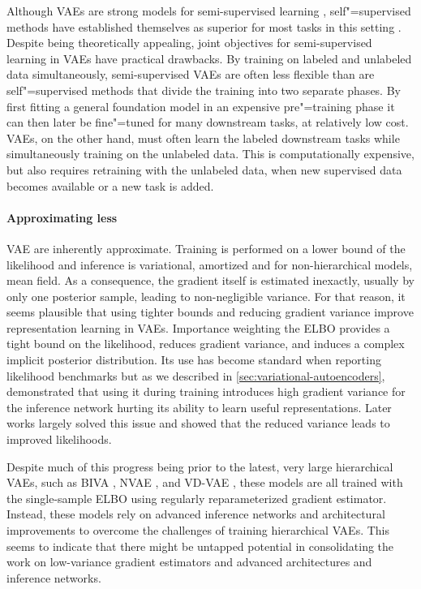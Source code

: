 Although VAEs are strong models for semi-supervised learning \parencite{kingma_semi-supervised_2014,kingma_improved_2016,maaloe_biva_2019}, self"=supervised methods have established themselves as superior for most tasks in this setting \cite{baevski_wav2vec_2020,jiang_speech_2021, liu_learning_2023}. 
Despite being theoretically appealing, joint objectives for semi-supervised learning in VAEs have practical drawbacks. By training on labeled and unlabeled data simultaneously, semi-supervised VAEs are often less flexible than are self"=supervised methods that divide the training into two separate phases. By first fitting a general foundation model in an expensive pre"=training phase it can then later be fine"=tuned for many downstream tasks, at relatively low cost. 
VAEs, on the other hand, must often learn the labeled downstream tasks while simultaneously training on the unlabeled data. This is computationally expensive, but also requires retraining with the unlabeled data, when new supervised data becomes available or a new task is added. 


\paragraph*{Approximating less}
VAE are inherently approximate. Training is performed on a lower bound of the likelihood and inference is variational, amortized and for non-hierarchical models, mean field. As a consequence, the gradient itself is estimated inexactly, usually by only one posterior sample, leading to non-negligible variance. 
For that reason, it seems plausible that using tighter bounds and reducing gradient variance improve representation learning in VAEs. 
Importance weighting the ELBO \parencite{burda_importance_2016} provides a tight bound on the likelihood, reduces gradient variance, and induces a complex implicit posterior distribution. 
Its use has become standard when reporting likelihood benchmarks but as we described in \cref{sec:variational-autoencoders}, \textcite{rainforth_tighter_2019} demonstrated that using it during training introduces high gradient variance for the inference network hurting its ability to learn useful representations. Later works largely solved this issue \parencite{roeder_sticking_2017,tucker_doubly_2019,bauer_generalized_2021} and showed that the reduced variance leads to improved likelihoods. 

Despite much of this progress being prior to the latest, very large hierarchical VAEs, such as BIVA \parencite{maaloe_biva_2019}, NVAE \parencite{vahdat_nvae_2020}, and VD-VAE \parencite{child_very_2021}, these models are all trained with the single-sample ELBO using regularly reparameterized gradient estimator. Instead, these models rely on advanced inference networks \parencite{maaloe_biva_2019} and architectural improvements \parencite{vahdat_nvae_2020, child_very_2021} to overcome the challenges of training hierarchical VAEs. 
This seems to indicate that there might be untapped potential in consolidating the work on low-variance gradient estimators and advanced architectures and inference networks.


